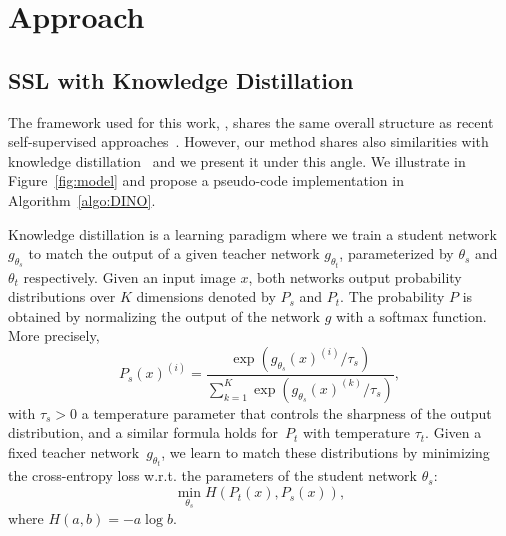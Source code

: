 
\section{Approach}
\subsection{SSL with Knowledge Distillation}
\label{sec:method}

The framework used for this work, \OURS, shares the same overall structure as recent self-supervised approaches~\cite{caron2020unsupervised,chen2020exploring,chen2020simple,grill2020bootstrap,he2020momentum}.
However, our method shares also similarities with knowledge distillation~\cite{hinton2015distilling} and we present it under this angle.
We illustrate \OURS in Figure~\ref{fig:model} and propose a pseudo-code implementation in Algorithm~\ref{algo:DINO}.

Knowledge distillation is a learning paradigm where we train a student network $g_{\theta_s}$ to match the output of a given teacher network $g_{\theta_t}$, parameterized by $\theta_s$ and $\theta_t$ respectively.
Given an input image $x$, both networks output probability distributions over $K$ dimensions denoted by $P_s$ and $P_t$.
The probability $P$ is obtained by normalizing the output of the network $g$ with a softmax function. More precisely,
\begin{equation}
  P_s(x)^{(i)} = \frac{\exp(g_{\theta_s}(x)^{(i)} / \tau_s)}{\sum_{k=1}^K \exp(g_{\theta_s}(x)^{(k)} / \tau_s)},
\end{equation}                                                                                                                                                                                        
with $\tau_s>0$ a temperature parameter that controls the sharpness of the output distribution, and a similar formula holds for~$P_t$ with temperature $\tau_t$.
Given a fixed teacher network~$g_{\theta_t}$, we learn to match these distributions by minimizing the cross-entropy loss w.r.t. the parameters of the student network $\theta_s$:
\begin{equation}
        \min_{\theta_s} H(P_t(x), P_s(x)),
  \label{eq:kd}                                                                                                                                                                                       
\end{equation}
where $H(a, b) = - a \log b$.

